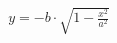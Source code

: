 \documentclass[preview]{standalone}
\begin{document}
\begin{align*}
y=- b \cdot \sqrt{1 - \frac{x^2}{a^2}}
\end{align*}
\end{document}
